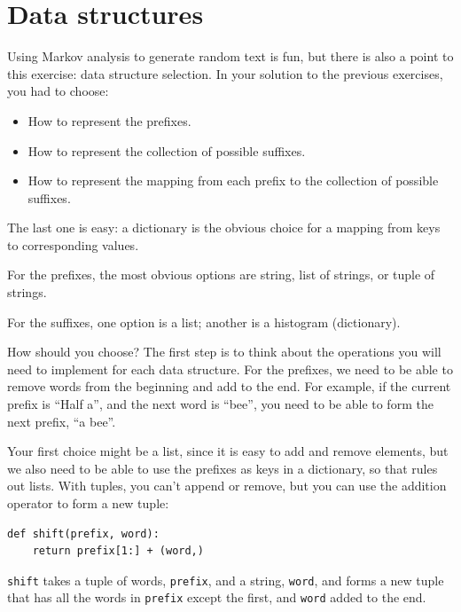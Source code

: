 \documentclass[10pt]{book}
\begin{document}
\section{Data structures}

Using Markov analysis to generate random text is fun, but there is
also a point to this exercise: data structure selection.  In your
solution to the previous exercises, you had to choose:

\begin{itemize}

\item How to represent the prefixes.

\item How to represent the collection of possible suffixes.

\item How to represent the mapping from each prefix to
the collection of possible suffixes.

\end{itemize}

The last one is easy: a dictionary is the obvious choice
for a mapping from keys to corresponding values.

For the prefixes, the most obvious options are string,
list of strings, or tuple of strings.

For the suffixes,
one option is a list; another is a histogram (dictionary).

How should you choose?  The first step is to think about
the operations you will need to implement for each data structure.
For the prefixes, we need to be able to remove words from
the beginning and add to the end.  For example, if the current
prefix is ``Half a'', and the next word is ``bee'', you need
to be able to form the next prefix, ``a bee''.

Your first choice might be a list, since it is easy to add
and remove elements, but we also need to be able to use the
prefixes as keys in a dictionary, so that rules out lists.
With tuples, you can't append or remove, but you can use
the addition operator to form a new tuple:

\begin{verbatim}
def shift(prefix, word):
    return prefix[1:] + (word,)
\end{verbatim}
%
{\tt shift} takes a tuple of words, {\tt prefix}, and a string, 
{\tt word}, and forms a new tuple that has all the words
in {\tt prefix} except the first, and {\tt word} added to
the end.
\end{document}

